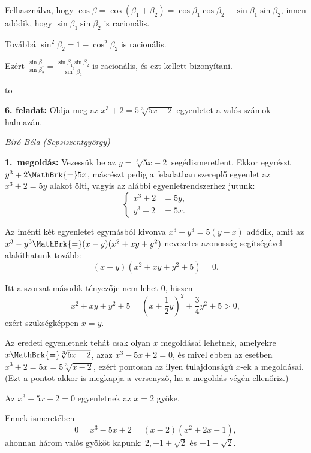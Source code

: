 \documentclass[a4paper,10pt]{article}
\newcommand{\ki}[2]{\hfill {\it #1 (#2)}\medskip}
\newcommand{\vonal}{\hbox to \hsize{\hskip2truecm\hrulefill\hskip2truecm}}
\begin{document}
\smallskip

\noindent Felhasználva, hogy
$\cos\beta=\cos(\beta_1+\beta_2)=
\cos\beta_1\cos\beta_2-\sin\beta_1\sin\beta_2$, innen adódik, hogy
$\sin\beta_1\sin\beta_2$ is racionális.

\smallskip

\noindent Továbbá $\sin^2\beta_2=1-\cos^2\beta_2$ is racionális.


\smallskip

\noindent Ezért
$\displaystyle\frac{\sin\beta_1}{\sin\beta_2}=\frac{\sin\beta_1\sin\beta_2}{\sin^2\beta_2}$
is racionális, és ezt kellett bizonyítani.

\vonal

{\bf 6. feladat: } Oldja meg az $x^3+2=5\sqrt[3]{5x-2}$ egyenletet a valós számok halmazán.

\ki{Bíró Béla}{Sepsiszentgyörgy}\medskip

{\bf 1.~megoldás:} Vezessük be az $y=\sqrt[3]{5x-2}$ segédismeretlent. Ekkor egyrészt $y^3+2\MathBrk{=}5x$, másrészt pedig a feladatban szereplő egyenlet az $x^3+2=5y$ alakot ölti, vagyis az alábbi egyenletrendszerhez jutunk:
\[\left\{\begin{aligned}x^3+2&=5y,\\y^3+2&=5x.\end{aligned}\right.\]

\noindent Az iménti két egyenletet egymásból kivonva $x^3-y^3=5(y-x)$ adódik, amit az $x^3-y^3\MathBrk{=}(x-y)(x^2+xy+y^2)$ nevezetes azonosság segítségével alakíthatunk tovább:
\[(x-y)(x^2+xy+y^2+5)=0.\]

\noindent Itt a szorzat második tényezője nem lehet 0, hiszen
\[x^2+xy+y^2+5=\left(x+\frac12y\right)^2+\frac34y^2+5>0,\]
ezért szükségképpen $x=y$. 

\smallskip

\noindent Az eredeti egyenletnek tehát csak olyan $x$ megoldásai lehetnek, amelyekre $x\MathBrk{=}\sqrt[3]{5x-2}$, azaz $x^3-5x+2=0$, és mivel ebben az esetben $x^3+2=5x=5\sqrt[3]{x-2}$, ezért pontosan az ilyen tulajdonságú $x$-ek a megoldásai. (Ezt a pontot akkor is megkapja a versenyző, ha a megoldás végén ellenőriz.)


\smallskip

\noindent Az $x^3-5x+2=0$ egyenletnek az $x=2$ gyöke. 


\smallskip

\noindent Ennek ismeretében
\[0=x^3-5x+2=(x-2)(x^2+2x-1),\]
ahonnan három valós gyököt kapunk: $2, -1+\sqrt{2}$ és $-1-\sqrt{2}$.
\end{document}
